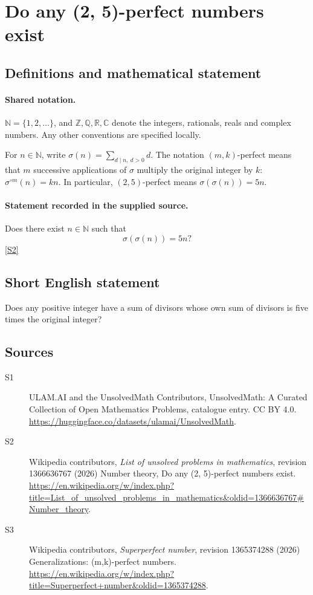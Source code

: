 \documentclass[11pt]{article}
\newcommand{\sref}[2]{\hyperlink{source:#1:#2}{[S#2]}}
\begin{document}
\section{Do any (2, 5)-perfect numbers exist}\label{statement}

\subsection{Definitions and mathematical statement}

\paragraph{Shared notation.}$\mathbb N=\{1,2,\ldots\}$, and $\mathbb Z,\mathbb Q,\mathbb R,\mathbb C$ denote the integers, rationals, reals and complex numbers. Any other conventions are specified locally.


For $n\in\mathbb N$, write $\sigma(n)=\sum_{d\mid n,\ d>0}d$. The notation $(m,k)$-perfect means that $m$ successive applications of $\sigma$ multiply the original integer by $k$: $\sigma^{\circ m}(n)=kn$. In particular, $(2,5)$-perfect means $\sigma(\sigma(n))=5n$.
\paragraph{Statement recorded in the supplied source.}
Does there exist $n\in\mathbb N$ such that
\[\sigma(\sigma(n))=5n?\] \sref{statement}{2}
\subsection{Short English statement}
Does any positive integer have a sum of divisors whose own sum of divisors is five times the original integer?
\subsection{Sources}
\begin{description}
\item[\hypertarget{source:statement:1}{S1}] ULAM.AI and the UnsolvedMath Contributors, UnsolvedMath: A Curated Collection of Open Mathematics Problems, catalogue entry. CC BY 4.0. \url{https://huggingface.co/datasets/ulamai/UnsolvedMath}.
\item[\hypertarget{source:statement:2}{S2}] Wikipedia contributors, \emph{List of unsolved problems in mathematics}, revision 1366636767 (2026) Number theory, Do any (2, 5)-perfect numbers exist. \url{https://en.wikipedia.org/w/index.php?title=List_of_unsolved_problems_in_mathematics&oldid=1366636767#Number_theory}.
\item[\hypertarget{source:statement:3}{S3}] Wikipedia contributors, \emph{Superperfect number}, revision 1365374288 (2026) Generalizations: (m,k)-perfect numbers. \url{https://en.wikipedia.org/w/index.php?title=Superperfect+number&oldid=1365374288}.
\end{description}
\label{end:statement}
\end{document}
